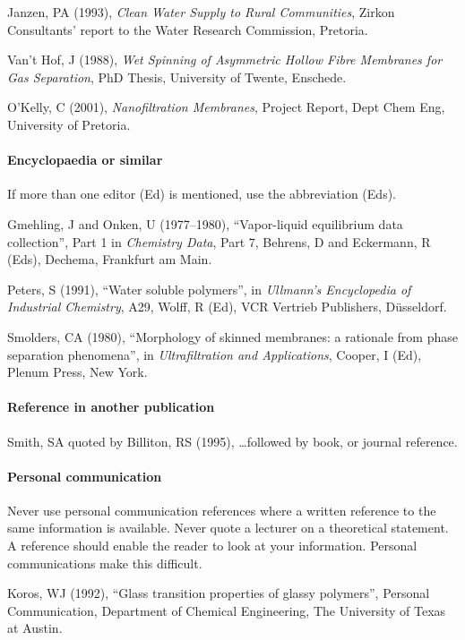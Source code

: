 \documentclass[a5paper, 10pt]{article}
\begin{document}
Janzen, PA (1993), \textit{Clean Water Supply to Rural Communities},
  Zirkon Consultants' report to the Water Research Commission,
  Pretoria.
  
Van't Hof, J (1988), \textit{Wet Spinning of Asymmetric Hollow
    Fibre Membranes for Gas Separation}, PhD Thesis, University of
  Twente, Enschede.
  
O'Kelly, C (2001), \textit{Nanofiltration Membranes}, Project
  Report, Dept Chem Eng, University of Pretoria.

\paragraph{Encyclopaedia or similar}
If more than one editor (Ed) is mentioned, use the abbreviation (Eds).

Gmehling, J and Onken, U (1977--1980), ``Vapor-liquid
  equilibrium data collection'', Part 1 in \textit{Chemistry Data}, Part 7,
  Behrens, D and Eckermann, R (Eds), Dechema, Frankfurt am Main.

Peters, S (1991), ``Water soluble polymers'', in
  \textit{Ullmann's Encyclopedia of Industrial Chemistry}, A29, Wolff,
  R (Ed), VCR Vertrieb Publishers, D\"usseldorf.

Smolders, CA (1980), ``Morphology of skinned membranes: a
  rationale from phase separation phenomena'', in
  \textit{Ultrafiltration and Applications}, Cooper, I (Ed), Plenum
  Press, New York.

\paragraph{Reference in another publication}

Smith, SA quoted by Billiton, RS (1995), \dots followed by
  book, or journal reference.


\paragraph{Personal communication}
Never use personal communication references where a written reference
to the same information is available.  Never quote a lecturer on a
theoretical statement.  A reference should enable the reader to look
at your information.  Personal communications make this difficult.

Koros, WJ (1992), ``Glass transition properties of glassy
  polymers'', Personal Communication, Department of Chemical
  Engineering, The University of Texas at Austin.
\end{document}
